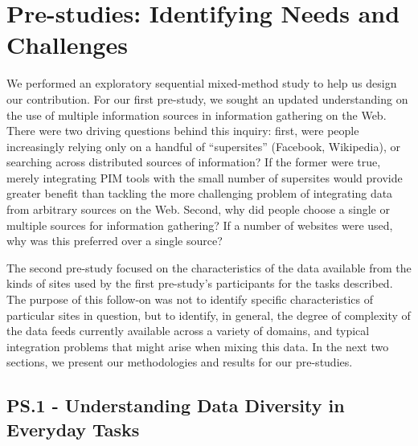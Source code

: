 \documentclass{sigchi}
\begin{document}
\section{Pre-studies: Identifying Needs and Challenges}

We performed an exploratory sequential mixed-method study to help us design our contribution. For our first pre-study, we sought an updated understanding on the use of multiple information sources in information gathering on the Web. There were two driving questions behind this inquiry: first, were people increasingly relying only on a handful of ``supersites'' (Facebook, Wikipedia), or searching across distributed sources of information?  If the former were true, merely integrating PIM tools with the small number of supersites would provide greater benefit than tackling the more challenging problem of integrating data from arbitrary sources on the Web.  Second, why did people choose a single or multiple sources for information gathering?  If a number of websites were used, why was this preferred over a single source?


The second pre-study focused on the characteristics of the data available from the kinds of sites used by the first pre-study's participants for the tasks described. The purpose of this follow-on was not to identify specific characteristics of particular sites in question, but to identify, in general, the degree of complexity of the data feeds currently available across a variety of domains, and typical integration problems that might arise when mixing this data.  In the next two sections, we present our methodologies and results for our pre-studies.


\subsection{PS.1 - Understanding Data Diversity in Everyday Tasks}
\end{document}
